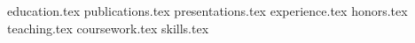 \documentclass[12pt, a4paper]{awesome-cv}
\newcommand*{\sectiondir}{cv/}
\begin{document}
\makecvheader


{education.tex}
\vspace*{-15pt}
{publications.tex}
{presentations.tex}
{experience.tex}
{honors.tex}
{teaching.tex}
{coursework.tex}
{skills.tex}


\end{document}

